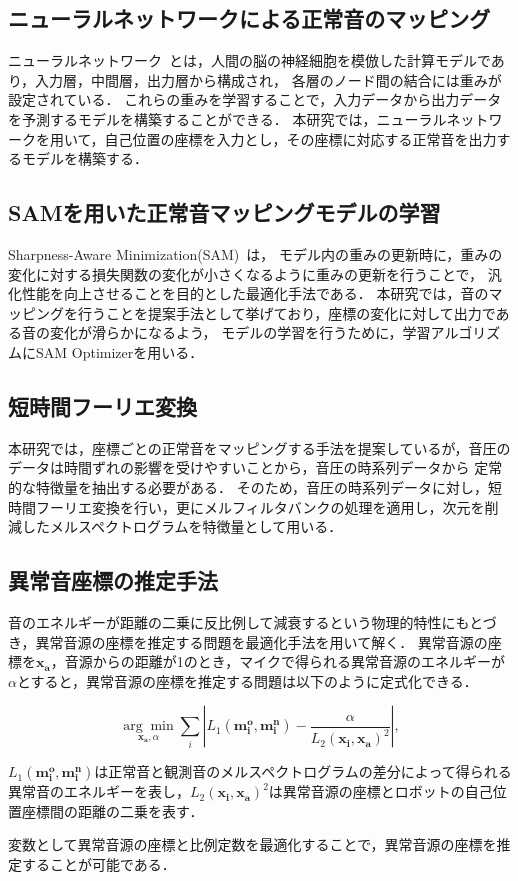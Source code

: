 \documentclass[../main]{subfiles}
\begin{document}
\subsection{ニューラルネットワークによる正常音のマッピング}
ニューラルネットワーク~\cite{Rumelhart1986}とは，人間の脳の神経細胞を模倣した計算モデルであり，入力層，中間層，出力層から構成され，
各層のノード間の結合には重みが設定されている．
これらの重みを学習することで，入力データから出力データを予測するモデルを構築することができる．
本研究では，ニューラルネットワークを用いて，自己位置の座標を入力とし，その座標に対応する正常音を出力するモデルを構築する．
\subsection{SAMを用いた正常音マッピングモデルの学習}
Sharpness-Aware Minimization(SAM)~\cite{Foret2020}は，
モデル内の重みの更新時に，重みの変化に対する損失関数の変化が小さくなるように重みの更新を行うことで，
汎化性能を向上させることを目的とした最適化手法である．
本研究では，音のマッピングを行うことを提案手法として挙げており，座標の変化に対して出力である音の変化が滑らかになるよう，
モデルの学習を行うために，学習アルゴリズムにSAM Optimizerを用いる．
\subsection{短時間フーリエ変換}
本研究では，座標ごとの正常音をマッピングする手法を提案しているが，音圧のデータは時間ずれの影響を受けやすいことから，音圧の時系列データから
定常的な特徴量を抽出する必要がある．
そのため，音圧の時系列データに対し，短時間フーリエ変換を行い，更にメルフィルタバンクの処理を適用し，次元を削減したメルスペクトログラムを特徴量として用いる．
\subsection{異常音座標の推定手法}
音のエネルギーが距離の二乗に反比例して減衰するという物理的特性にもとづき，異常音源の座標を推定する問題を最適化手法を用いて解く．
異常音源の座標を$\mathbf{x_a}$，音源からの距離が1のとき，マイクで得られる異常音源のエネルギーが$\alpha$とすると，異常音源の座標を推定する問題は以下のように定式化できる．

\begin{equation}
  \underset{\mathbf{x_a}, \alpha}{\arg\min} \sum_i \left| L_1 (\mathbf{m_i^o}, \mathbf{m_i^n}) - \frac{\alpha}{L_2 (\mathbf{x_i}, \mathbf{x_a})^2} \right|,
\end{equation}


$L_1 (\mathbf{m_i^o}, \mathbf{m_i^n})$は正常音と観測音のメルスペクトログラムの差分によって得られる異常音のエネルギーを表し，$L_2 (\mathbf{x_i}, \mathbf{x_a})^2$は異常音源の座標とロボットの自己位置座標間の距離の二乗を表す．

変数として異常音源の座標と比例定数を最適化することで，異常音源の座標を推定することが可能である．
\end{document}
